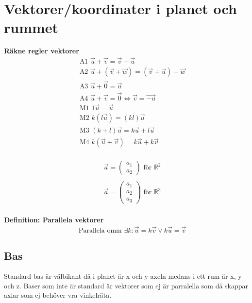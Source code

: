 \section{Vektorer/koordinater i planet och rummet}
\textbf{Räkne regler vektorer}
\begin{align*}
  &\quad \text{A1 } \vec{u} + \vec{v} = \vec{v} + \vec{u} \\
  &\quad \text{A2 } \vec{u} + (\vec{v}+\vec{w}) = (\vec{v}+\vec{u}) + \vec{w} \\
  &\quad \text{A3 } \vec{u} + \vec{0} = \vec{u} \\
  &\quad \text{A4 } \vec{u} + \vec{v}  = \vec{0} \Leftrightarrow \vec{v} = \vec{-u} \\
  &\quad \text{M1 } 1\vec{u} = \vec{u} \\
  &\quad \text{M2 } k(l\vec{u}) = (kl)\vec{u} \\
  &\quad \text{M3 } (k+l)\vec{u} = k\vec{u} + l\vec{u} \\
  &\quad \text{M4 } k(\vec{u}+\vec{v}) = k\vec{u} + k\vec{v} \\
\end{align*}

\begin{align*}
  &\quad \vec{a} = \begin{pmatrix}
  a_1 \\
  a_2 
  \end{pmatrix} \text{ för } \mathbb{R}^2 \\
  &\quad \\
  &\quad \vec{a} = \begin{pmatrix}
  a_1 \\
  a_2 \\
  a_3
  \end{pmatrix} \text{ för } \mathbb{R}^3 \\
\end{align*}

\textbf{Definition: Parallela vektorer}
\begin{align*}
  &\quad \text{Parallela omm } \exists{k}: \vec{u} = k\vec{v} \lor k\vec{u} = \vec{v}
\end{align*}


\subsection{Bas}
Standard bas är välbikant då i planet är x och y axeln medans i ett rum är x, y och z.
Baser som inte är standard är vektorer som ej är parralella som då skappar axlar som ej
behöver vra vinkelräta. \newline

